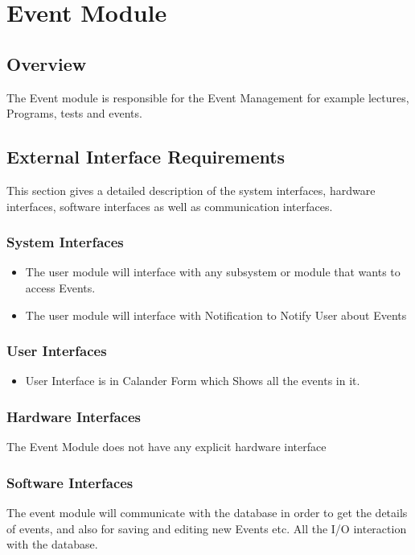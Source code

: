 \section{Event Module}
\subsection{Overview}
The Event module is responsible for the Event Management for example lectures, Programs, tests and events.
 
\subsection{External Interface Requirements}
This section gives a detailed description of the system interfaces, hardware interfaces, software interfaces as well as communication interfaces. 

	\subsubsection{System Interfaces}
		\begin{itemize}
			\item The user module will interface with any subsystem or module that wants to access Events.

			\item  The user module will interface with Notification to Notify User about Events
		
		\end{itemize}
	\subsubsection{User Interfaces }
	\begin{itemize} 

	\item User Interface is in Calander Form which Shows all the events in it.

 \end{itemize}
 
	\subsubsection{Hardware Interfaces }
	The Event Module does not have any explicit hardware interface

	\subsubsection{Software Interfaces } 
	The event module will communicate with the database in order to get the details of events, and also for saving and editing new Events etc. All the I/O interaction with the database.
	
